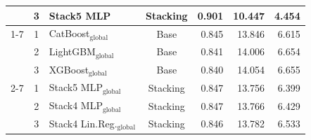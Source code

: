 \begin{table}[htbp]
\begin{tabular}{cclcrrr}
            & 3 & Stack5 MLP                             & Stacking & 0.901 & 10.447 &  4.454 \\
        \cmidrule{1-7}
        \multirow{6}{*}{IFN2$+$IFN3}
            & 1 & CatBoost$_{\text{global}}$             & Base     & 0.845 & 13.846 &  6.615 \\
            & 2 & LightGBM$_{\text{global}}$             & Base     & 0.841 & 14.006 &  6.654 \\
            & 3 & XGBoost$_{\text{global}}$              & Base     & 0.840 & 14.054 &  6.655 \\
        \cmidrule{2-7}
            & 1 & Stack5 MLP$_{\text{global}}$           & Stacking & 0.847 & 13.756 &  6.399 \\
            & 2 & Stack4 MLP$_{\text{global}}$           & Stacking & 0.847 & 13.766 &  6.429 \\
            & 3 & Stack4 Lin.Reg.$_{\text{global}}$      & Stacking & 0.846 & 13.782 &  6.533 \\
        \bottomrule
    \end{tabular}
\end{table}
